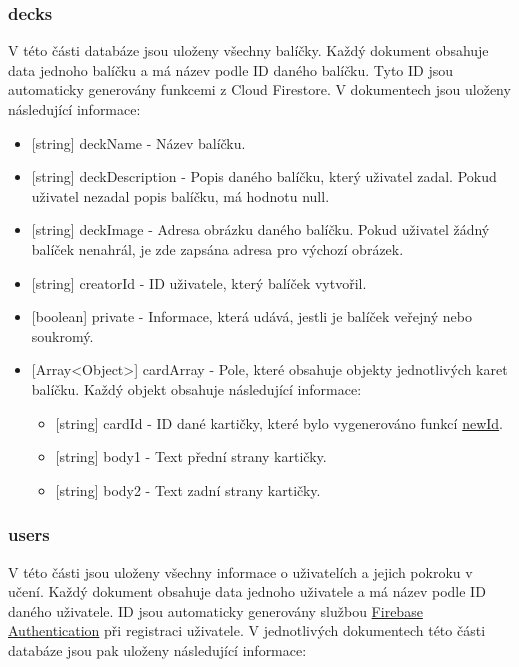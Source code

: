 \documentclass[a4paper,12pt]{article}
\begin{document}
\subsubsection{decks}
V této části databáze jsou uloženy všechny balíčky. Každý dokument
obsahuje data jednoho balíčku a má název podle ID daného balíčku. Tyto
ID jsou automaticky generovány funkcemi z Cloud Firestore. V dokumentech
jsou uloženy následující informace:
\begin{itemize}
\item
{[}string{]} deckName - Název balíčku.
\item
{[}string{]} deckDescription - Popis daného balíčku, který uživatel
zadal. Pokud uživatel nezadal popis balíčku, má hodnotu null.
\item
{[}string{]} deckImage - Adresa obrázku daného balíčku. Pokud uživatel
žádný balíček nenahrál, je zde zapsána adresa pro výchozí obrázek.
\item
{[}string{]} creatorId - ID uživatele, který balíček vytvořil.
\item
{[}boolean{]} private - Informace, která udává, jestli je balíček
veřejný nebo soukromý.
\item
{[}Array\textless Object\textgreater{]} cardArray - Pole, které obsahuje
objekty jednotlivých karet balíčku. Každý objekt obsahuje následující
informace:
\begin{itemize}
\item
  {[}string{]} cardId - ID dané kartičky, které bylo vygenerováno funkcí
  \href{module-deck.html\#~newId}{newId}.
\item
  {[}string{]} body1 - Text přední strany kartičky.
\item
  {[}string{]} body2 - Text zadní strany kartičky.
\end{itemize}
\end{itemize}

\subsubsection{users}
V této části jsou uloženy všechny informace o uživatelích a jejich pokroku v učení. Každý dokument obsahuje data jednoho uživatele a má název podle ID daného uživatele. ID jsou automaticky generovány službou \href{https://firebase.google.com/docs/auth}{Firebase Authentication} při registraci uživatele. V jednotlivých dokumentech této části databáze jsou pak uloženy následující informace:
\end{document}
